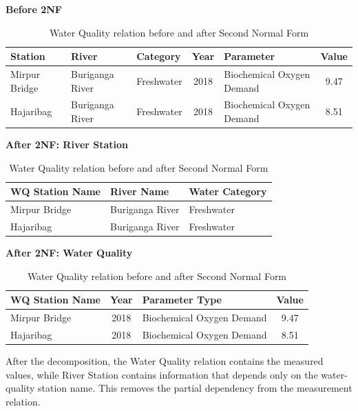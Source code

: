 \begin{table}[H]
\centering
\caption{Water Quality relation before and after Second Normal Form}
\label{tab:2nf-example}
\small
\renewcommand{\arraystretch}{1.2}

\textbf{Before 2NF}\\[2mm]

\begin{tabular}{@{}p{2.8cm}p{2.5cm}p{1.7cm}cp{3.4cm}c@{}}
\toprule
\textbf{Station} &
\textbf{River} &
\textbf{Category} &
\textbf{Year} &
\textbf{Parameter} &
\textbf{Value} \\
\midrule
Mirpur Bridge &
Buriganga River &
Freshwater &
2018 &
Biochemical Oxygen Demand &
9.47 \\

Hajaribag &
Buriganga River &
Freshwater &
2018 &
Biochemical Oxygen Demand &
8.51 \\
\bottomrule
\end{tabular}

\vspace{5mm}

\textbf{After 2NF: River Station}\\[2mm]

\begin{tabular}{@{}p{4.2cm}p{3.8cm}p{2.8cm}@{}}
\toprule
\textbf{WQ Station Name} &
\textbf{River Name} &
\textbf{Water Category} \\
\midrule
Mirpur Bridge & Buriganga River & Freshwater \\
Hajaribag & Buriganga River & Freshwater \\
\bottomrule
\end{tabular}

\vspace{5mm}

\textbf{After 2NF: Water Quality}\\[2mm]

\begin{tabular}{@{}p{3.4cm}cp{4.2cm}c@{}}
\toprule
\textbf{WQ Station Name} &
\textbf{Year} &
\textbf{Parameter Type} &
\textbf{Value} \\
\midrule
Mirpur Bridge & 2018 & Biochemical Oxygen Demand & 9.47 \\
Hajaribag & 2018 & Biochemical Oxygen Demand & 8.51 \\
\bottomrule
\end{tabular}
\end{table}

After the decomposition, the Water Quality relation contains the measured
values, while River Station contains information that depends only on the
water-quality station name. This removes the partial dependency from the
measurement relation.

